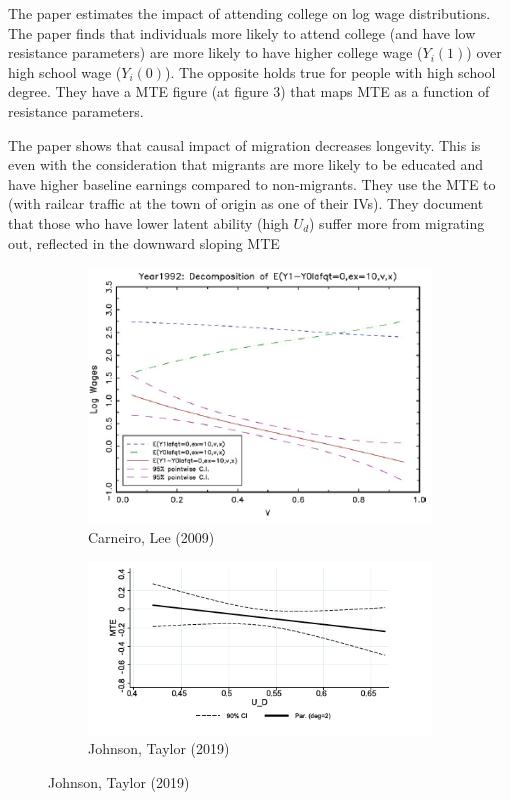 \begin{mdframed}[backgroundcolor=yellow!5] 
\begin{example} The paper estimates the impact of attending college on log wage distributions. The paper finds that individuals more likely to attend college (and have low resistance parameters) are more likely to have higher college wage ($Y_i(1)$) over high school wage ($Y_i(0)$). The opposite holds true for people with high school degree. They have a MTE figure (at figure 3) that maps MTE as a function of resistance parameters.
\end{example}
\begin{example} The paper shows that causal impact of migration decreases longevity. This is even with the consideration that migrants are more likely to be educated and have higher baseline earnings compared to non-migrants. They use the MTE to (with railcar traffic at the town of origin as one of their IVs). They document that those who have lower latent ability (high $U_d$) suffer more from migrating out, reflected in the downward sloping MTE 
\end{example}
\centering
\begin{figure}[H]
\begin{subfigure}{0.5\textwidth}
\includegraphics[width=\textwidth]{fig11_1}
\caption{Carneiro, Lee (2009)}
\end{subfigure}
\begin{subfigure}{0.5\textwidth}
\includegraphics[width=\textwidth]{fig11_2}
\caption{Johnson, Taylor (2019)}
\end{subfigure}
\end{figure}
\end{mdframed}
